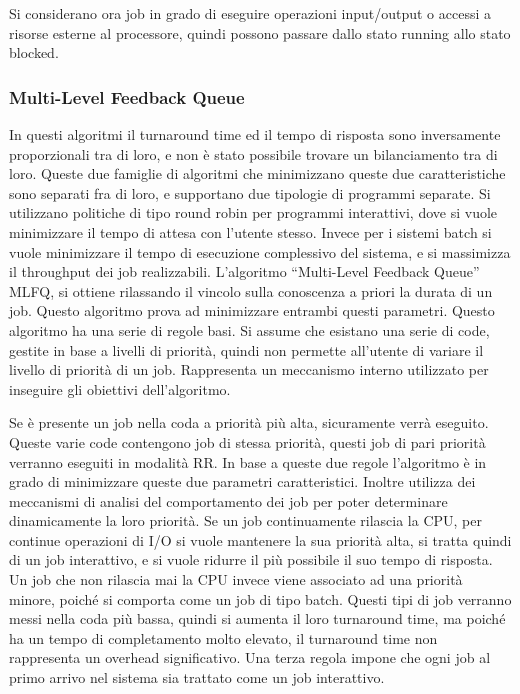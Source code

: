 \documentclass{article}
\numberwithin{equation}{subsection}
\begin{document}
Si considerano ora job in grado di eseguire operazioni input/output o accessi a risorse esterne al processore, quindi possono passare dallo stato running allo stato 
blocked. 


\subsubsection{Multi-Level Feedback Queue}

In questi algoritmi il turnaround time ed il tempo di risposta sono inversamente proporzionali tra di loro, e non è stato possibile trovare un bilanciamento tra di loro. 
Queste due famiglie di algoritmi che minimizzano queste due caratteristiche sono separati fra di loro, e supportano due tipologie di programmi separate. Si utilizzano 
politiche di tipo round robin per programmi interattivi, dove si vuole minimizzare il tempo di attesa con l'utente stesso. Invece per i sistemi batch si vuole 
minimizzare il tempo di esecuzione complessivo del sistema, e si massimizza il throughput dei job realizzabili. 
L'algoritmo ``Multi-Level Feedback Queue'' MLFQ, si ottiene rilassando il vincolo sulla conoscenza a priori la durata di un job. Questo algoritmo prova ad minimizzare 
entrambi questi parametri. 
Questo algoritmo ha una serie di regole basi. Si assume che esistano una serie di code, gestite in base a livelli di priorità, quindi non permette all'utente di 
variare il livello di priorità di un job. Rappresenta un meccanismo interno utilizzato per inseguire gli obiettivi dell'algoritmo. 

Se è presente un job nella coda a priorità più alta, sicuramente verrà eseguito. Queste varie code contengono job di stessa priorità, questi job di pari priorità 
verranno eseguiti in modalità RR. 
In base a queste due regole l'algoritmo è in grado di minimizzare queste due parametri caratteristici. Inoltre utilizza dei meccanismi di analisi del comportamento 
dei job per poter determinare dinamicamente la loro priorità. 
Se un job continuamente rilascia la CPU, per continue operazioni di I/O si vuole mantenere la sua priorità alta, si tratta quindi di un job interattivo, e si vuole 
ridurre il più possibile il suo tempo di risposta. Un job che non rilascia mai la CPU invece viene associato ad una priorità minore, poiché si comporta come un job di 
tipo batch. Questi tipi di job verranno messi nella coda più bassa, quindi si aumenta il loro turnaround time, ma poiché ha un tempo di completamento molto elevato, il 
turnaround time non rappresenta un overhead significativo. 
Una terza regola impone che ogni job al primo arrivo nel sistema sia trattato come un job interattivo. 
\end{document}
